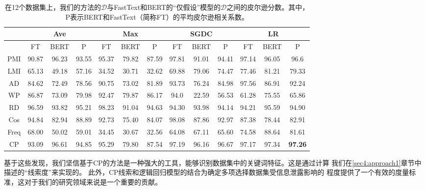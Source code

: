 \begin{table}[th]
\scriptsize
\centering
\setlength{\tabcolsep}{3pt}
\begin{tabular}{cccc|ccc|ccc|ccc}
\toprule
     & \multicolumn{3}{c|}{Ave}      & \multicolumn{3}{c|}{Max}      & \multicolumn{3}{c|}{SGDC}       & \multicolumn{3}{c}{LR}     \\ \midrule
     & FT & BERT & P     & FT & BERT & P     & FT & BERT & P     & FT & BERT & P     \\ \midrule
PMI  & 90.87       & 96.23   & 93.55 & 95.37       & 79.82   & 87.59 & 97.81       & 91.01   & 94.41 & 97.14       & 96.05   & 96.6  \\
LMI  & 65.13       & 49.18   & 57.16 & 34.52       & 30.71   & 32.62 & 69.88       & 79.06   & 74.47 & 77.46       & 81.21   & 79.33 \\
AD   & 84.62       & 72.49   & 78.56 & 90.75       & 73.02   & 81.89 & 93.73       & 76.24   & 84.98 & 97.56       & 86.91   & 92.24 \\
WP   & 86.87       & 73.09   & 79.98 & 92.47       & 79.87   & 86.17 & 94.0        & 22.59   & 56.53  & 61.28       & 75.55   & 65.86 \\
RD   & 96.59       & 93.82   & 95.21 & 98.23       & 91.04   & 94.63 & 94.30       & 93.98   & 94.14 & 94.21       & 95.59   & 94.90 \\
Cos  & 94.84       & 82.94   & 88.89 & 92.73       & 75.40   & 84.07 & 98.08       & 87.86   & 92.97 & 87.38       & 78.44   & 82.91 \\
Freq & 68.00       & 50.02   & 59.01 & 34.45       & 30.67   & 32.56 & 64.08       & 67.11   & 65.60 & 74.58       & 88.64   & 81.61 \\
CP   & 93.09        & 96.61   & 94.85 & 95.29       & 79.80   & 87.54 & 97.19       & 96.16   & 96.67 & 97.17       & 97.34   & \textbf{97.26} \\ 
\bottomrule
\end{tabular}
\caption{\label{best_method} 在12个数据集上，我们的方法的$\mathcal{D}$与FastText和BERT的``仅假设''模型的$\mathcal{D}$之间的皮尔逊分数。其中，P表示BERT和FastText（简称FT）的平均皮尔逊相关系数。}
\end{table}

基于这些发现，我们坚信基于CP的方法是一种强大的工具，能够识别数据集中的关键词特征。这是通过计算
我们在\ref{sec4:approach1}章节中描述的``线索度''来实现的。
此外，CP线索和逻辑回归模型的结合为确定多项选择数据集受信息泄露影响的
程度提供了一个有效的度量标准，这对于我们的研究领域来说是一个重要的贡献。

